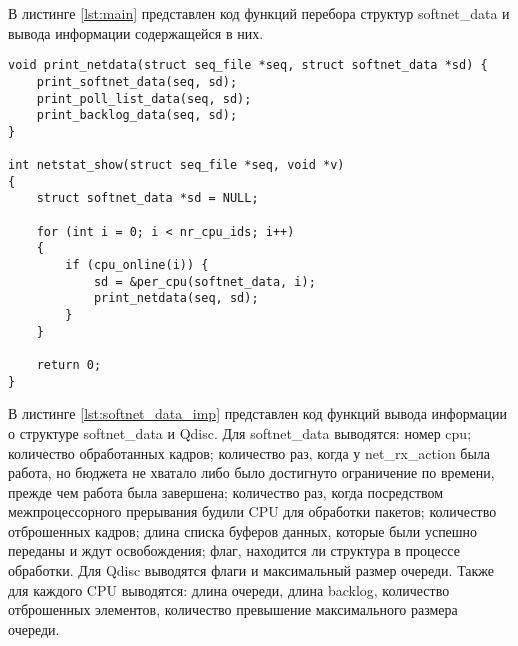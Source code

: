 В листинге \ref{lst:main} представлен код функций перебора структур softnet\_data и вывода информации содержащейся в них.

\begin{center}
	\captionsetup{justification=raggedright,singlelinecheck=off}
	\begin{lstlisting}[label=lst:main,caption=Функции перебора и вывода информации о структуре softnet\_data ,showstringspaces=false]
void print_netdata(struct seq_file *seq, struct softnet_data *sd) {
	print_softnet_data(seq, sd);
	print_poll_list_data(seq, sd);
	print_backlog_data(seq, sd);
}

int netstat_show(struct seq_file *seq, void *v)
{
	struct softnet_data *sd = NULL;
	
	for (int i = 0; i < nr_cpu_ids; i++)
	{
		if (cpu_online(i)) {
			sd = &per_cpu(softnet_data, i);
			print_netdata(seq, sd);
		}
	}
	
	return 0;
}
	\end{lstlisting}
\end{center}
\FloatBarrier

В листинге \ref{lst:softnet_data_imp} представлен код функций вывода информации о структуре softnet\_data и Qdisc. Для softnet\_data выводятся: номер cpu; количество обработанных кадров; количество раз, когда у net\_rx\_action была работа, но бюджета не хватало либо было достигнуто ограничение по времени, прежде чем работа была завершена; количество раз, когда посредством межпроцессорного прерывания будили CPU для обработки пакетов; количество отброшенных кадров; длина списка буферов данных, которые были успешно переданы и ждут освобождения; флаг, находится ли структура в процессе обработки. Для Qdisc выводятся флаги и максимальный размер очереди. Также для каждого CPU выводятся: длина очереди, длина backlog, количество отброшенных элементов, количество превышение максимального размера очереди.


